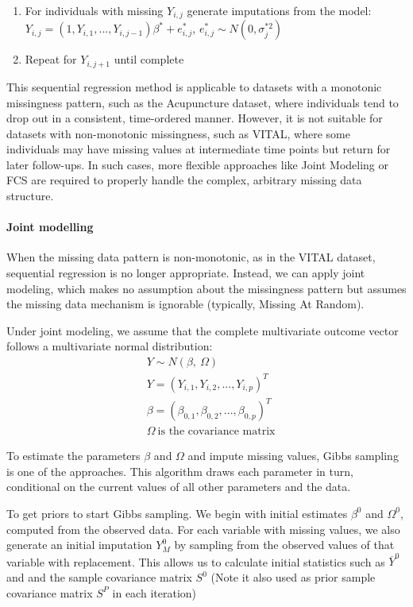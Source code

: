 \documentclass{article}
\begin{document}
\begin{enumerate}
\def\labelenumi{\arabic{enumi}.}
\setcounter{enumi}{3}
\item
  For individuals with missing \(Y_{i,j}\) generate imputations from the
  model:
  \(Y_{i,j} = (1,Y_{i,1},...,Y_{i,j-1}) \beta^{*} + e^{*}_{i,j}\),
  \(e_{i,j}^{*} \sim{N} (0,\sigma^{*2}_{j})\)
\item
  Repeat for \(Y_{i,j+1}\) until complete
\end{enumerate}

This sequential regression method is applicable to datasets with a
monotonic missingness pattern, such as the Acupuncture dataset, where
individuals tend to drop out in a consistent, time-ordered manner.
However, it is not suitable for datasets with non-monotonic missingness,
such as VITAL, where some individuals may have missing values at
intermediate time points but return for later follow-ups. In such cases,
more flexible approaches like Joint Modeling or FCS are required to
properly handle the complex, arbitrary missing data structure.

\paragraph{Joint modelling}\label{joint-modelling}

When the missing data pattern is non-monotonic, as in the VITAL dataset,
sequential regression is no longer appropriate. Instead, we can apply
joint modeling, which makes no assumption about the missingness pattern
but assumes the missing data mechanism is ignorable (typically, Missing
At Random).

Under joint modeling, we assume that the complete multivariate outcome
vector follows a multivariate normal distribution: \begin{align*}
    & Y \sim N(\beta,\ \Omega) \\
    & Y = (Y_{i,1},Y_{i,2},...,Y_{i,p})^{T} \\
    & \beta = (\beta_{0,1},\beta_{0,2},...,\beta_{0,p})^{T} \\
    & \Omega \ \text{is the covariance matrix}
    \end{align*}

To estimate the parameters \(\beta\) and \(\Omega\) and impute missing
values, Gibbs sampling is one of the approaches. This algorithm draws
each parameter in turn, conditional on the current values of all other
parameters and the data.

To get priors to start Gibbs sampling. We begin with initial estimates
\(\beta^{0}\) and \(\Omega^{0}\), computed from the observed data. For
each variable with missing values, we also generate an initial
imputation \(Y_{M}^{0}\) by sampling from the observed values of that
variable with replacement. This allows us to calculate initial
statistics such as \(\overline{Y}^{0}\) and and the sample covariance
matrix \(S^{0}\) (Note it also used as prior sample covariance matrix
\(S^{P}\) in each iteration)
\end{document}
